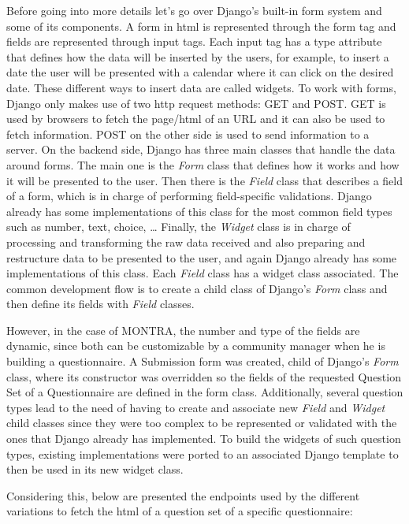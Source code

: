 Before going into more details let's go over Django's built-in form system and some of its components.
A form in \gls{html} is represented through the form tag and fields are represented through input tags.
Each input tag has a type attribute that defines how the data will be inserted by the users, for example, to insert a date the user will be presented with a calendar where it can click on the desired date.
These different ways to insert data are called widgets.
To work with forms, Django only makes use of two \gls{http} request methods: GET and POST.
GET is used by browsers to fetch the page/\gls{html} of an URL and it can also be used to fetch information.
POST on the other side is used to send information to a server.
On the backend side, Django has three main classes that handle the data around forms.
The main one is the \textit{Form} class that defines how it works and how it will be presented to the user.
Then there is the \textit{Field} class that describes a field of a form, which is in charge of performing field-specific validations.
Django already has some implementations of this class for the most common field types such as number, text, choice, \dots
Finally, the \textit{Widget} class is in charge of processing and transforming the raw data received and also preparing and restructure data to be presented to the user, and again Django already has some implementations of this class.
Each \textit{Field} class has a widget class associated.
The common development flow is to create a child class of Django's \textit{Form} class and then define its fields with \textit{Field} classes.

However, in the case of MONTRA, the number and type of the fields are dynamic, since both can be customizable by a community manager when he is building a questionnaire.
A Submission form was created, child of Django's \textit{Form} class, where its constructor was overridden so the fields of the requested Question Set of a Questionnaire are defined in the form class.
Additionally, several question types lead to the need of having to create and associate new \textit{Field} and \textit{Widget} child classes since they were too complex to be represented or validated with the ones that Django already has implemented.
To build the widgets of such question types, existing implementations were ported to an associated Django template to then be used in its new widget class.

Considering this, below are presented the endpoints used by the different variations to fetch the \gls{html} of a question set of a specific questionnaire:

